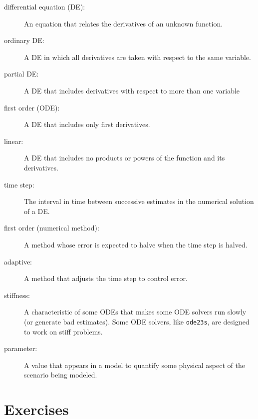 \documentclass{book}
\begin{document}
\begin{description}

\item[differential equation (DE):] An equation that relates the
derivatives of an unknown function.

\item[ordinary DE:] A DE in which all derivatives are taken with
respect to the same variable.

\item[partial DE:] A DE that includes derivatives with respect to
more than one variable

\item[first order (ODE):] A DE that includes only first derivatives.

\item[linear:] A DE that includes no products or powers of the
function and its derivatives.

\item[time step:] The interval in time between successive estimates
in the numerical solution of a DE.

\item[first order (numerical method):] A method whose error is expected
to halve when the time step is halved.

\item[adaptive:] A method that adjusts the time step to control error.

\item[stiffness:] A characteristic of some ODEs that makes some ODE
solvers run slowly (or generate bad estimates). Some ODE solvers,
like {\tt ode23s}, are designed to work on stiff problems.

\item[parameter:] A value that appears in a model to quantify some
physical aspect of the scenario being modeled.

\end{description}

\section{Exercises}

\newcommand{\degree}{\ensuremath{^\circ}}
\end{document}
